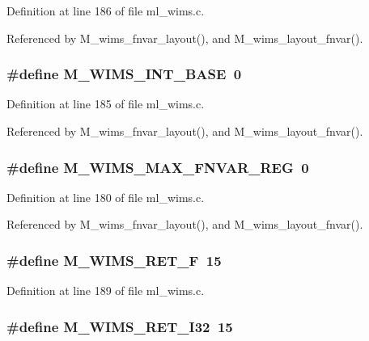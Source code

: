 Definition at line 186 of file ml\_\-wims.c.

Referenced by M\_\-wims\_\-fnvar\_\-layout(), and M\_\-wims\_\-layout\_\-fnvar().
\subsubsection{\setlength{\rightskip}{0pt plus 5cm}\#define M\_\-WIMS\_\-INT\_\-BASE~0}\label{ml__wims_8c_819f5aee11a74e4d71a5bcf11c90dc8a}




Definition at line 185 of file ml\_\-wims.c.

Referenced by M\_\-wims\_\-fnvar\_\-layout(), and M\_\-wims\_\-layout\_\-fnvar().
\subsubsection{\setlength{\rightskip}{0pt plus 5cm}\#define M\_\-WIMS\_\-MAX\_\-FNVAR\_\-REG~0}\label{ml__wims_8c_95ff52497f2b7089d64f189ea3e30691}




Definition at line 180 of file ml\_\-wims.c.

Referenced by M\_\-wims\_\-fnvar\_\-layout(), and M\_\-wims\_\-layout\_\-fnvar().
\subsubsection{\setlength{\rightskip}{0pt plus 5cm}\#define M\_\-WIMS\_\-RET\_\-F~15}\label{ml__wims_8c_1467e61116daa65e5d796dfd0a58cf02}




Definition at line 189 of file ml\_\-wims.c.
\subsubsection{\setlength{\rightskip}{0pt plus 5cm}\#define M\_\-WIMS\_\-RET\_\-I32~15}\label{ml__wims_8c_3ac37d56005b51933f1f53ab98706275}




